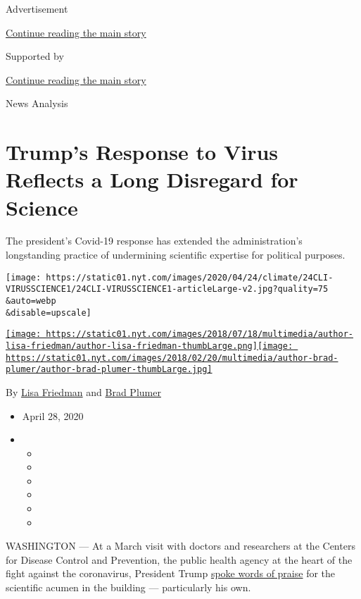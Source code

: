 Advertisement

\protect\hyperlink{after-top}{Continue reading the main story}

Supported by

\protect\hyperlink{after-sponsor}{Continue reading the main story}

News Analysis

\hypertarget{trumps-response-to-virus-reflects-a-long-disregard-for-science}{%
\section{Trump's Response to Virus Reflects a Long Disregard for
Science}\label{trumps-response-to-virus-reflects-a-long-disregard-for-science}}

The president's Covid-19 response has extended the administration's
longstanding practice of undermining scientific expertise for political
purposes.

\texttt{[image: https://static01.nyt.com/images/2020/04/24/climate/24CLI-VIRUSSCIENCE1/24CLI-VIRUSSCIENCE1-articleLarge-v2.jpg?quality=75\\\&auto=webp\\\&disable=upscale]}

\href{https://www.nytimes.com/by/lisa-friedman}{\texttt{[image: https://static01.nyt.com/images/2018/07/18/multimedia/author-lisa-friedman/author-lisa-friedman-thumbLarge.png]}}\href{https://www.nytimes.com/by/brad-plumer}{\texttt{[image: https://static01.nyt.com/images/2018/02/20/multimedia/author-brad-plumer/author-brad-plumer-thumbLarge.jpg]}}

By \href{https://www.nytimes.com/by/lisa-friedman}{Lisa Friedman} and
\href{https://www.nytimes.com/by/brad-plumer}{Brad Plumer}

\begin{itemize}
\item
  April 28, 2020
\item
  \begin{itemize}
  \item
  \item
  \item
  \item
  \item
  \item
  \end{itemize}
\end{itemize}

WASHINGTON --- At a March visit with doctors and researchers at the
Centers for Disease Control and Prevention, the public health agency at
the heart of the fight against the coronavirus, President Trump
\href{https://www.whitehouse.gov/briefings-statements/remarks-president-trump-tour-centers-disease-control-prevention-atlanta-ga/}{spoke
words of praise} for the scientific acumen in the building ---
particularly his own.

